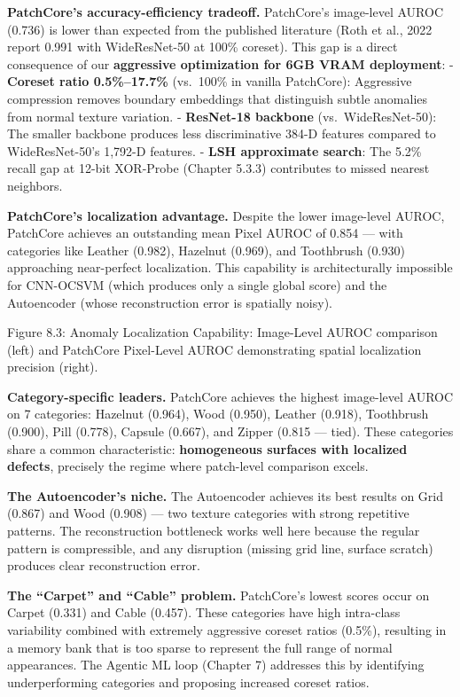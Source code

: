 \textbf{PatchCore's accuracy-efficiency tradeoff.} PatchCore's image-level AUROC (0.736) is lower than expected from the published literature (Roth et al., 2022 report 0.991 with WideResNet-50 at 100\% coreset). This gap is a direct consequence of our \textbf{aggressive optimization for 6GB VRAM deployment}: - \textbf{Coreset ratio 0.5\%--17.7\%} (vs.~100\% in vanilla PatchCore): Aggressive compression removes boundary embeddings that distinguish subtle anomalies from normal texture variation. - \textbf{ResNet-18 backbone} (vs.~WideResNet-50): The smaller backbone produces less discriminative 384-D features compared to WideResNet-50's 1,792-D features. - \textbf{LSH approximate search}: The 5.2\% recall gap at 12-bit XOR-Probe (Chapter 5.3.3) contributes to missed nearest neighbors.

\textbf{PatchCore's localization advantage.} Despite the lower image-level AUROC, PatchCore achieves an outstanding mean Pixel AUROC of 0.854 --- with categories like Leather (0.982), Hazelnut (0.969), and Toothbrush (0.930) approaching near-perfect localization. This capability is architecturally impossible for CNN-OCSVM (which produces only a single global score) and the Autoencoder (whose reconstruction error is spatially noisy).

Figure 8.3: Anomaly Localization Capability: Image-Level AUROC comparison (left) and PatchCore Pixel-Level AUROC demonstrating spatial localization precision (right).

\textbf{Category-specific leaders.} PatchCore achieves the highest image-level AUROC on 7 categories: Hazelnut (0.964), Wood (0.950), Leather (0.918), Toothbrush (0.900), Pill (0.778), Capsule (0.667), and Zipper (0.815 --- tied). These categories share a common characteristic: \textbf{homogeneous surfaces with localized defects}, precisely the regime where patch-level comparison excels.

\textbf{The Autoencoder's niche.} The Autoencoder achieves its best results on Grid (0.867) and Wood (0.908) --- two texture categories with strong repetitive patterns. The reconstruction bottleneck works well here because the regular pattern is compressible, and any disruption (missing grid line, surface scratch) produces clear reconstruction error.

\textbf{The ``Carpet'' and ``Cable'' problem.} PatchCore's lowest scores occur on Carpet (0.331) and Cable (0.457). These categories have high intra-class variability combined with extremely aggressive coreset ratios (0.5\%), resulting in a memory bank that is too sparse to represent the full range of normal appearances. The Agentic ML loop (Chapter 7) addresses this by identifying underperforming categories and proposing increased coreset ratios.


